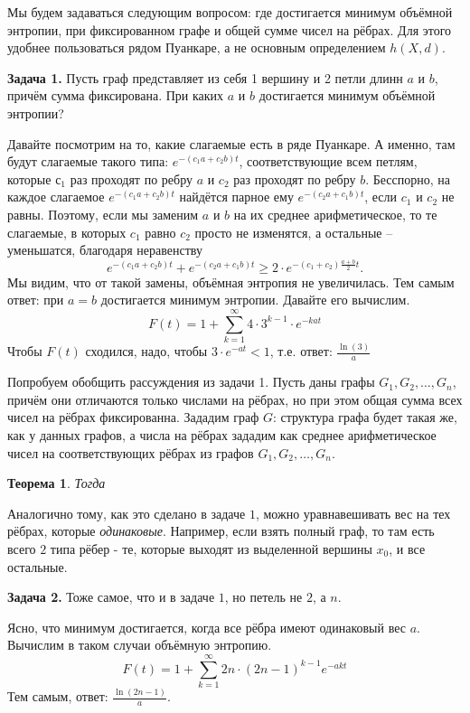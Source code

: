 \documentclass[11pt]{article}
\theoremstyle{definition}
\theoremstyle{plain}
\theoremstyle{plain}
\newtheorem{theorem}{Теорема}
\def\geq{\geqslant}
\begin{document}
Мы будем задаваться следующим вопросом: где достигается минимум объёмной энтропии, при фиксированном графе и общей сумме чисел на рёбрах.
Для этого удобнее пользоваться рядом Пуанкаре, а не основным определением $h(X, d)$.

\bigskip
{\bf Задача 1.} Пусть граф представляет из себя 1 вершину и 2 петли длинн $a$ и $b$, причём сумма фиксирована. 
При каких $a$ и $b$ достигается минимум объёмной энтропии?

\smallskip
Давайте посмотрим на то, какие слагаемые есть в ряде Пуанкаре. А именно, там будут слагаемые такого типа: $e^{-(c_1 a + c_2 b)t}$, 
соответствующие всем петлям, которые $с_1$ раз проходят по ребру $a$ и $c_2$ раз проходят по ребру $b$. 
Бесспорно, на каждое слагаемое $e^{-(c_1 a + c_2 b)t}$ найдётся парное ему $e^{-(c_2 a + c_1 b)t}$, если $c_1$ и $c_2$ не равны.
Поэтому, если мы заменим $a$ и $b$ на их среднее арифметическое, то те слагаемые, в которых $c_1$ равно $c_2$ просто не изменятся,
а остальные -- уменьшатся, благодаря неравенству 
$$
e^{-(c_1 a + c_2 b)t} + e^{-(c_2 a + c_1 b)t} \geq 2 \cdot e^{-(c_1 + c_2)\frac{a + b}{2}t}.
$$
Мы видим, что от такой замены, объёмная энтропия не увеличилась. 
Тем самым ответ: при $a = b$ достигается минимум энтропии. Давайте его вычислим.
$$
F(t) = 1 + \sum_{k=1}^{\infty} 4 \cdot 3^{k-1} \cdot e^{-ka t} 
$$
Чтобы $F(t)$ сходился, надо, чтобы $3\cdot e^{-at} < 1$, т.е. ответ: $\frac{\ln(3)}{a}$

\bigskip
Попробуем обобщить рассуждения из задачи 1. 
Пусть даны графы $G_1,G_2,\dots,G_n$, причём они отличаются только числами на рёбрах, но при этом общая сумма всех чисел на рёбрах фиксированна.
Зададим граф $G$: структура графа будет такая же, как у данных графов, а числа на рёбрах зададим как 
среднее арифметическое чисел на соответствующих рёбрах из графов $G_1, G_2, \dots, G_n$.

\begin{theorem}
Тогда
\end{theorem}

Аналогично тому, как это сделано в задаче $1$, можно уравнавешивать вес на тех рёбрах, которые {\it одинаковые}. 
Например, если взять полный граф, то там есть всего $2$ типа рёбер - те, которые выходят из выделенной вершины $x_0$, и все остальные. 

\bigskip
{\bf Задача 2.} Тоже самое, что и в задаче $1$, но петель не $2$, а $n$.

\smallskip
Ясно, что минимум достигается, когда все рёбра имеют одинаковый вес $a$. 
Вычислим в таком случаи объёмную энтропию.
$$
F(t) = 1 + \sum_{k = 1}^{\infty} 2n\cdot (2n-1)^{k-1} e^{-akt}
$$
Тем самым, ответ: $\frac{\ln(2n-1)}{a}$.
\end{document}
